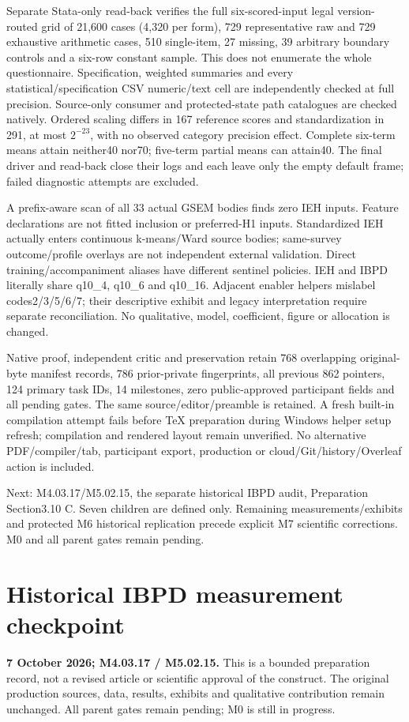 \documentclass[11pt,a4paper]{article}
\begin{document}
Separate Stata-only read-back verifies the full six-scored-input legal
version-routed grid of 21,600 cases (4,320 per form), 729 representative
raw and 729 exhaustive arithmetic cases, 510 single-item, 27 missing,
39 arbitrary boundary controls and a six-row constant sample.
This does not enumerate the whole questionnaire.
Specification, weighted summaries and every statistical/specification CSV
numeric/text cell are independently checked at full precision.
Source-only consumer and protected-state path catalogues are checked natively.
Ordered scaling differs in 167
reference scores and standardization in 291, at most $2^{-23}$,
with no observed category precision effect. Complete six-term means
attain neither40 nor70; five-term partial means can attain40.
The final driver and read-back close their logs and each leave only
the empty default frame; failed diagnostic attempts are excluded.

A prefix-aware scan of all 33 actual GSEM bodies finds zero IEH inputs.
Feature declarations are not fitted inclusion or preferred-H1 inputs.
Standardized IEH actually enters continuous k-means/Ward source bodies;
same-survey outcome/profile overlays are not independent external validation.
Direct training/accompaniment aliases have different sentinel policies.
IEH and IBPD literally share q10\_4, q10\_6 and q10\_16.
Adjacent enabler helpers mislabel codes2/3/5/6/7; their descriptive
exhibit and legacy interpretation require separate reconciliation.
No qualitative, model, coefficient, figure or allocation is changed.

Native proof, independent critic and preservation retain 768 overlapping
original-byte manifest records, 786 prior-private fingerprints, all previous
862 pointers, 124 primary task IDs, 14 milestones, zero public-approved
participant fields and all pending gates. The same source/editor/preamble
is retained. A fresh built-in compilation attempt fails before TeX
preparation during Windows helper setup refresh; compilation and rendered
layout remain unverified. No alternative PDF/compiler/tab, participant export,
production or cloud/Git/history/Overleaf action is included.

Next: M4.03.17/M5.02.15, the separate historical IBPD audit,
Preparation Section3.10 C. Seven children are defined only.
Remaining measurements/exhibits and protected M6 historical replication
precede explicit M7 scientific corrections. M0 and all parent gates remain pending.

\clearpage
\section*{Historical IBPD measurement checkpoint}
\textbf{7 October 2026; M4.03.17 / M5.02.15.}
This is a bounded preparation record, not a revised article or scientific
approval of the construct. The original production sources, data, results,
exhibits and qualitative contribution remain unchanged. All parent gates
remain pending; M0 is still in progress.
\end{document}
